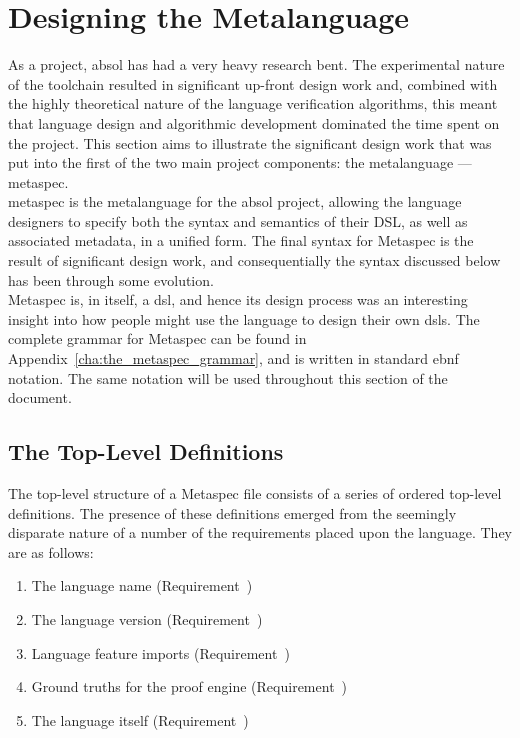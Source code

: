\chapter{Designing the Metalanguage} %
\label{cha:designing_the_metalanguage}
As a project, \gls{absol} has had a very heavy research bent. 
The experimental nature of the toolchain resulted in significant up-front design work and, combined with the highly theoretical nature of the language verification algorithms, this meant that language design and algorithmic development dominated the time spent on the project.
This section aims to illustrate the significant design work that was put into the first of the two main project components: the metalanguage --- \gls{metaspec}. \\

\gls{metaspec} is the metalanguage for the \gls{absol} project, allowing the language designers to specify both the syntax and semantics of their DSL, as well as associated metadata, in a unified form. 
The final syntax for Metaspec is the result of significant design work, and consequentially the syntax discussed below has been through some evolution. \\

Metaspec is, in itself, a \gls{dsl}, and hence its design process was an interesting insight into how people might use the language to design their own \glspl{dsl}. 
The complete grammar for Metaspec can be found in Appendix~\ref{cha:the_metaspec_grammar}, and is written in standard \gls{ebnf} notation. 
The same notation will be used throughout this section of the document. 

\section{The Top-Level Definitions} %
\label{sec:the_top_level_definitions}
The top-level structure of a Metaspec file consists of a series of ordered top-level definitions.
The presence of these definitions emerged from the seemingly disparate nature of a number of the requirements placed upon the language.
They are as follows:
\begin{enumerate}
    \item The language name (Requirement~)
    \item The language version (Requirement~)
    \item Language feature imports (Requirement~)
    \item Ground truths for the proof engine (Requirement~)
    \item The language itself (Requirement~)
\end{enumerate}

